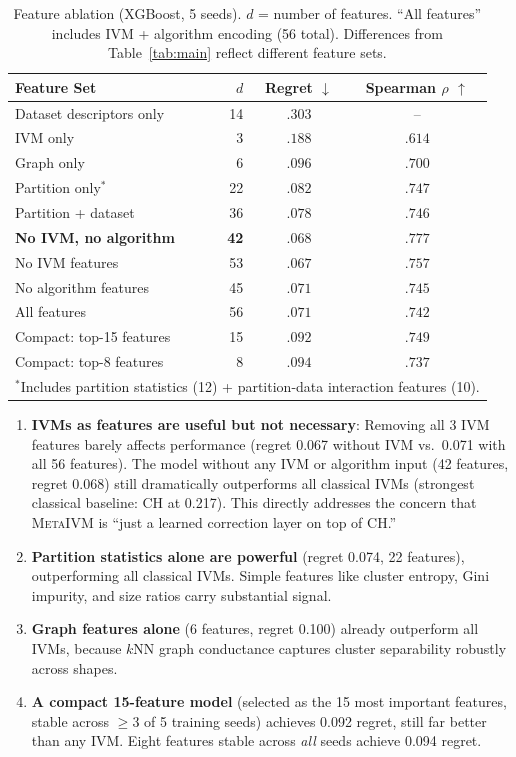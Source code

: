 \documentclass[10pt]{article} %
\newcommand{\ours}{\textsc{MetaIVM}}
\begin{document}
\begin{table}[t]
\centering
\caption{Feature ablation (XGBoost, 5 seeds). $d$ = number of features. ``All features'' includes IVM + algorithm encoding (56 total). Differences from Table~\ref{tab:main} reflect different feature sets.}
\label{tab:ablation}
\small
\begin{tabular}{lrcc}
\toprule
\textbf{Feature Set} & $d$ & \textbf{Regret} $\downarrow$ & \textbf{Spearman} $\rho$ $\uparrow$ \\
\midrule
Dataset descriptors only & 14 & $.303$ & -- \\
IVM only & 3 & $.188$ & $.614$ \\
Graph only & 6 & $.096$ & $.700$ \\
Partition only$^*$ & 22 & $.082$ & $.747$ \\
\midrule
Partition + dataset & 36 & $.078$ & $.746$ \\
\textbf{No IVM, no algorithm} & \textbf{42} & $\mathbf{.068}$ & $\mathbf{.777}$ \\
\midrule
No IVM features & 53 & $.067$ & $.757$ \\
No algorithm features & 45 & $.071$ & $.745$ \\
All features & 56 & $.071$ & $.742$ \\
\midrule
Compact: top-15 features & 15 & $.092$ & $.749$ \\
Compact: top-8 features & 8 & $.094$ & $.737$ \\
\bottomrule
\multicolumn{4}{l}{\footnotesize $^*$Includes partition statistics (12) + partition-data interaction features (10).}
\end{tabular}
\end{table}

\begin{enumerate}
    \item \textbf{IVMs as features are useful but not necessary}: Removing all 3 IVM features barely affects performance (regret 0.067 without IVM vs.\ 0.071 with all 56 features). The model without any IVM or algorithm input (42 features, regret 0.068) still dramatically outperforms all classical IVMs (strongest classical baseline: CH at 0.217). This directly addresses the concern that \ours{} is ``just a learned correction layer on top of CH.''
    \item \textbf{Partition statistics alone are powerful} (regret 0.074, 22 features), outperforming all classical IVMs. Simple features like cluster entropy, Gini impurity, and size ratios carry substantial signal.
    \item \textbf{Graph features alone} (6 features, regret 0.100) already outperform all IVMs, because $k$NN graph conductance captures cluster separability robustly across shapes.
    \item \textbf{A compact 15-feature model} (selected as the 15 most important features, stable across $\geq$3 of 5 training seeds) achieves 0.092 regret, still far better than any IVM. Eight features stable across \emph{all} seeds achieve 0.094 regret.
\end{enumerate}
\end{document}

